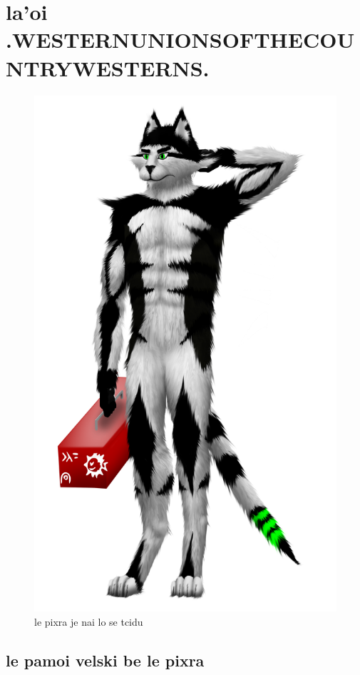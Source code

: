 \documentclass{report}
\begin{document}
\chapter{la'oi .WESTERNUNIONSOFTHECOUNTRYWESTERNS.}
\begin{figure}[ht]
	\centering
	\includegraphics[keepaspectratio, width=\textwidth, height=0.75\textheight]{50x/toolbox/westernunionsofthecountrywesterns.png}
	\caption[center]{le pixra je nai lo se tcidu}
\end{figure}
\section{le pamoi velski be le pixra}
\end{document}

